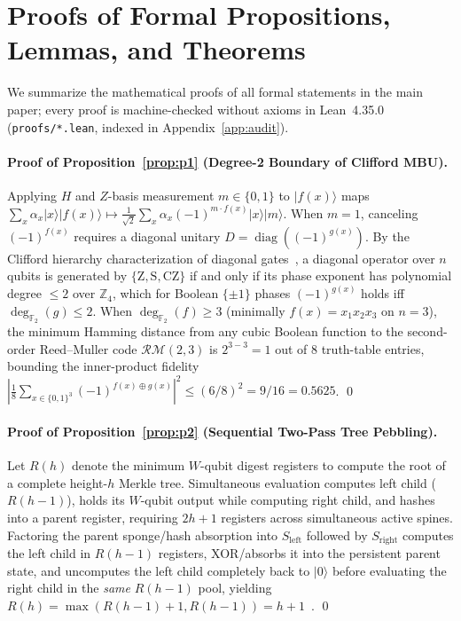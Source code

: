 \documentclass[acmsmall,screen,anonymous]{acmart}
\DeclareRobustCommand{\_}{\ifmmode\text{\char95}\else\char95\penalty0\relax\fi}
\theoremstyle{plain}
\begin{document}
\section{Proofs of Formal Propositions, Lemmas, and Theorems}
\label{app:proofs}

We summarize the mathematical proofs of all formal statements in the main paper; every proof is machine-checked without axioms in Lean~4.35.0 (\texttt{proofs/*.lean}, indexed in Appendix~\ref{app:audit}).

\paragraph{Proof of Proposition~\ref{prop:p1} (Degree-2 Boundary of Clifford MBU\@).}
Applying $H$ and $Z$-basis measurement $m \in \{0,1\}$ to $|f(x)\rangle$ maps $\sum_x \alpha_x |x\rangle |f(x)\rangle \mapsto \frac{1}{\sqrt{2}} \sum_x \alpha_x (-1)^{m \cdot f(x)} |x\rangle |m\rangle$. When $m = 1$, canceling $(-1)^{f(x)}$ requires a diagonal unitary $D = \operatorname{diag}((-1)^{g(x)})$. By the Clifford hierarchy characterization of diagonal gates~\cite{amy2016}, a diagonal operator over $n$ qubits is generated by $\{\mathrm{Z}, \mathrm{S}, \mathrm{CZ}\}$ if and only if its phase exponent has polynomial degree $\le 2$ over $\mathbb{Z}_4$, which for Boolean $\{ \pm 1 \}$ phases $(-1)^{g(x)}$ holds iff $\deg_{\mathbb{F}_2}(g) \le 2$. When $\deg_{\mathbb{F}_2}(f) \ge 3$ (minimally $f(x) = x_1 x_2 x_3$ on $n=3$), the minimum Hamming distance from any cubic Boolean function to the second-order Reed--Muller code $\mathcal{RM}(2, 3)$ is $2^{3-3} = 1$ out of $8$ truth-table entries, bounding the inner-product fidelity $|\frac{1}{8}\sum_{x \in \{0,1\}^3} (-1)^{f(x) \oplus g(x)}|^2 \le (6/8)^2 = 9/16 = 0.5625$. \qed

\paragraph{Proof of Proposition~\ref{prop:p2} (Sequential Two-Pass Tree Pebbling).}
Let $R(h)$ denote the minimum $W$-qubit digest registers to compute the root of a complete height-$h$ Merkle tree. Simultaneous evaluation computes left child ($R(h-1)$), holds its $W$-qubit output while computing right child, and hashes into a parent register, requiring $2h + 1$ registers across simultaneous active spines. Factoring the parent sponge/hash absorption into $S_{\mathrm{left}}$ followed by $S_{\mathrm{right}}$ computes the left child in $R(h-1)$ registers, XOR/absorbs it into the persistent parent state, and uncomputes the left child completely back to $|0\rangle$ before evaluating the right child in the \emph{same} $R(h-1)$ pool, yielding $R(h) = \max(R(h-1) + 1, R(h-1)) = h + 1$~\cite{sethi1970,kraniotis2003}. \qed
\end{document}
